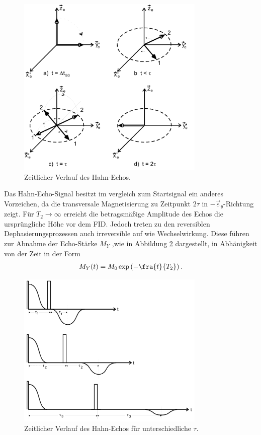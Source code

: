\begin{itemize}
\begin{figure}
  \includegraphics[width=0.8\textwidth]{spin-echo.PNG}
  \caption{Zeitlicher Verlauf des Hahn-Echos.}
  \label{fig:spin-echo}
\end{figure}

Das Hahn-Echo-Signal besitzt im vergleich zum Startsignal
ein anderes Vorzeichen, da die transversale
Magnetisierung zu Zeitpunkt $2\tau$ in $-\vec{e}_y$-Richtung zeigt.
Für $T_2\rightarrow\infty$ erreicht die betragsmäßige
Amplitude des Echos die
ursprüngliche Höhe vor dem FID.
Jedoch treten zu den reversiblen Dephasierungsprozessen auch
irreversible auf wie Wechselwirkung. Diese führen zur Abnahme der Echo-Stärke $M_Y$
,wie in Abbildung \ref{fig:tau_ver} dargestellt,
in Abhänigkeit von der Zeit in der Form
\begin{align}
  M_Y(t)=M_0 \exp\left(-\fra{t}{T_2}\right).\label{eqn:t2}
\end{align}

\begin{figure}
  \includegraphics[width=0.8\textwidth]{tau_ver.PNG}
  \caption{Zeitlicher Verlauf des Hahn-Echos für unterschiedliche $\tau$.}
  \label{fig:tau_ver}
\end{figure}


\end{itemize}
